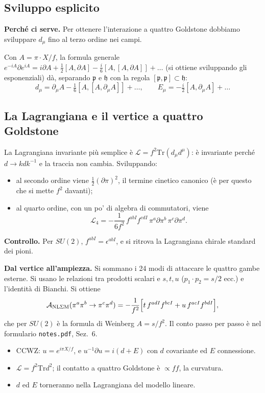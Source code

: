 \documentclass[11pt,a4paper]{article}
\numberwithin{equation}{section}
\theoremstyle{remark}
\newcommand{\Tr}{\mathrm{Tr}}
\newcommand{\p}{\mathfrak{p}}
\newcommand{\h}{\mathfrak{h}}
\begin{document}
\subsection{Sviluppo esplicito}

\textbf{Perché ci serve.} Per ottenere l'interazione a quattro Goldstone dobbiamo sviluppare $d_\mu$ fino al terzo ordine nei campi.

Con $A=\pi\cdot X/f$, la formula generale $e^{-iA}\partial e^{iA}=i\partial A+\frac12[A,\partial A]-\frac i6[A,[A,\partial A]]+\dots$ (si ottiene sviluppando gli esponenziali) dà, separando $\p$ e $\h$ con la regola $[\p,\p]\subset\h$:
\[
d_\mu=\partial_\mu A-\tfrac16[A,[A,\partial_\mu A]]+\dots,\qquad E_\mu=-\tfrac i2[A,\partial_\mu A]+\dots
\]

\subsection{La Lagrangiana e il vertice a quattro Goldstone}

La Lagrangiana invariante più semplice è $\mathcal L=f^2\Tr(d_\mu d^\mu)$: è invariante perché $d\to kdk^{-1}$ e la traccia non cambia. Sviluppando:
\begin{itemize}
\item al secondo ordine viene $\frac12(\partial\pi)^2$, il termine cinetico canonico (è per questo che si mette $f^2$ davanti);
\item al quarto ordine, con un po' di algebra di commutatori, viene
\begin{equation}
\mathcal L_4=-\frac{1}{6f^2}\,f^{abI}f^{cdI}\,\pi^a\partial\pi^b\,\pi^c\partial\pi^d .
\end{equation}
\end{itemize}
\textbf{Controllo.} Per $SU(2)$, $f^{abI}=\epsilon^{abI}$, e si ritrova la Lagrangiana chirale standard dei pioni. \checkmark

\textbf{Dal vertice all'ampiezza.} Si sommano i 24 modi di attaccare le quattro gambe esterne. Si usano le relazioni tra prodotti scalari e $s,t,u$ ($p_1\cdot p_2=s/2$ ecc.) e l'identità di Bianchi. Si ottiene
\begin{equation}
\mathcal A_{\rm NL\Sigma M}(\pi^a\pi^b\to\pi^c\pi^d)=-\frac{1}{f^2}\Big[t\,f^{adI}f^{bcI}+u\,f^{acI}f^{bdI}\Big],
\end{equation}
che per $SU(2)$ è la formula di Weinberg $A=s/f^2$. Il conto passo per passo è nel formulario \texttt{notes.pdf}, Sez.~6.

\begin{porta}
\begin{itemize}[nosep]
\item CCWZ: $u=e^{i\pi X/f}$, e $u^{-1}\partial u=i(d+E)$ con $d$ covariante ed $E$ connessione.
\item $\mathcal L=f^2\Tr d^2$; il contatto a quattro Goldstone è $\propto ff$, la curvatura.
\item $d$ ed $E$ torneranno nella Lagrangiana del modello lineare.
\end{itemize}
\end{porta}
\end{document}
